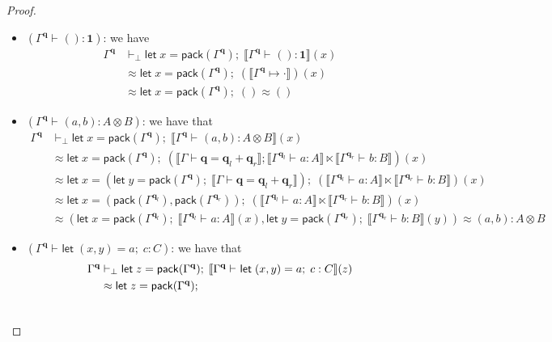 \documentclass[acmsmall,screen,anonymous,review]{acmart}
\newcommand{\mb}[1]{\ensuremath{\mathbf{#1}}}
\newcommand{\ms}[1]{\ensuremath{\mathsf{#1}}}
\newcommand{\letexpr}[3]{\ensuremath{\ms{let}\;#1 = #2;\;#3}}
\newcommand{\qsp}[4]{#1 \vdash #2 = #3 + #4}
\newcommand{\cwk}[2]{#1 \mapsto #2}
\newcommand{\hasty}[4]{#1 \vdash_{#2} #3: {#4}}
\newcommand{\dnt}[1]{\llbracket{#1}\rrbracket}
\begin{document}
\begin{proof}
\begin{itemize}
\begin{align*}
      &\approx \letexpr{x}{a}{b} : B
    \end{align*}
    \item $(\hasty{\Gamma^{\mb{q}}}{}{()}{\mb{1}})$: we have
    \begin{align*}
    \Gamma^{\mb{q}} &\vdash_\bot 
      \letexpr{x}{\ms{pack}(\Gamma^{\mb{q}})}{\dnt{\hasty{\Gamma^{\mb{q}}}{}{()}{\mb{1}}}(x)} \\
      &\approx 
      \letexpr{x}{\ms{pack}(\Gamma^{\mb{q}})}{(\dnt{\cwk{\Gamma^{\mb{q}}}{\cdot}})(x)} \\
      &\approx
      \letexpr{x}{\ms{pack}(\Gamma^{\mb{q}})}{()}
      \approx ()
    \end{align*}
    \item $(\hasty{\Gamma^{\mb{q}}}{}{(a, b)}{A \otimes B})$: we have that
    \begin{align*}
    \Gamma^{\mb{q}} &\vdash_\bot
      \letexpr{x}{\ms{pack}(\Gamma^{\mb{q}})}{\dnt{\hasty{\Gamma^{\mb{q}}}{}
        {(a, b)}{A \otimes B}}(x)} \\
      &\approx 
      \letexpr{x}{\ms{pack}(\Gamma^{\mb{q}})}{(
        \dnt{\qsp{\Gamma}{\mb{q}}{\mb{q}_l}{\mb{q}_r}}
        ; \dnt{\hasty{\Gamma^{\mb{q}_l}}{}{a}{A}} \ltimes \dnt{\hasty{\Gamma^{\mb{q}_r}}{}{b}{B}}
      )(x)
      } \\
      &\approx
      \letexpr{x}
      {(\letexpr{y}{\ms{pack}(\Gamma^{\mb{q}})}{\dnt{\qsp{\Gamma}{\mb{q}}{\mb{q}_l}{\mb{q}_r}}})}
      {(\dnt{\hasty{\Gamma^{\mb{q}_l}}{}{a}{A}} \ltimes \dnt{\hasty{\Gamma^{\mb{q}_r}}{}{b}{B}})(x)}
      \\
      &\approx
      \letexpr{x}
      {(\ms{pack}(\Gamma^{\mb{q}_l}), \ms{pack}(\Gamma^{\mb{q}_r}))}
      {(\dnt{\hasty{\Gamma^{\mb{q}_l}}{}{a}{A}} \ltimes \dnt{\hasty{\Gamma^{\mb{q}_r}}{}{b}{B}})(x)}
      \\
      &\approx
      (
        \letexpr{x}{\ms{pack}(\Gamma^{\mb{q}_l})}{\dnt{\hasty{\Gamma^{\mb{q}_l}}{}{a}{A}}(x)},
        \letexpr{y}{\ms{pack}(\Gamma^{\mb{q}_r})}{\dnt{\hasty{\Gamma^{\mb{q}_r}}{}{b}{B}}(y)}
      )
      \approx (a, b) : A \otimes B
    \end{align*}
    \item $(\hasty{\Gamma^{\mb{q}}}{}{\letexpr{(x, y)}{a}{c}}{C})$: we have that
    \begin{align*}
    \Gamma^{\mb{q}} &\vdash_\bot
      \letexpr{z}{\ms{pack}(\Gamma^{\mb{q}})}
        {\dnt{\hasty{\Gamma^{\mb{q}}}{}{\letexpr{(x, y)}{a}{c}}{C}}(z)} \\
      &\approx
      \letexpr{z}{\ms{pack}(\Gamma^{\mb{q}})}{ \\ & \qquad 
}
\end{align*}
\end{itemize}
\end{proof}
\end{document}
